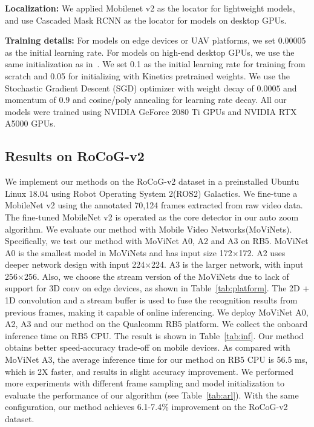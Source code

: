 \documentclass[letterpaper, 10 pt, conference]{ieeeconf}
\begin{document}
\noindent \textbf{Localization:} We applied Mobilenet v2\cite{sandler2018mobilenetv2} as the locator for lightweight models, and use Cascaded Mask RCNN\cite{hasan2021generalizable} as the locator for models on desktop GPUs.

\noindent \textbf{Training details:} For models on edge devices or UAV platforms, we set $0.00005$ as the initial learning rate. For models on high-end desktop GPUs, we use the same initialization as in~\cite{kothandaraman2022fourier}. We set 0.1 as the initial learning rate for training from scratch and 0.05 for initializing with Kinetics pretrained weights. We use the Stochastic Gradient Descent (SGD) optimizer with weight decay of $0.0005$ and momentum of $0.9$ and cosine/poly annealing for learning rate decay. All our models were trained using NVIDIA GeForce 2080 Ti GPUs and NVIDIA RTX A5000 GPUs.



\subsection{Results on RoCoG-v2}

We implement our methods on the RoCoG-v2 dataset in a preinstalled Ubuntu Linux 18.04 using Robot Operating System 2(ROS2) Galactics. We fine-tune a MobileNet v2\cite{sandler2018mobilenetv2} using the annotated 70,124 frames extracted from raw video data. The fine-tuned MobileNet v2\cite{sandler2018mobilenetv2} is operated as the core detector in our auto zoom algorithm. We evaluate our method with Mobile Video Networks(MoViNets)\cite{kondratyuk2021movinets}. Specifically, we test our method with MoViNet A0, A2 and A3 on RB5. MoViNet A0 is the smallest model in MoViNets and has input size 172$\times$172. A2 uses deeper network design with input 224$\times$224. A3 is the larger network, with input 256$\times$256. Also, we choose the stream version of the MoViNets due to lack of support for 3D conv on edge devices, as shown in Table~\ref{tab:platform}. The 2D + 1D convolution and a stream buffer is used to fuse the recognition results from previous frames, making it capable of online inferencing. We deploy MoViNet A0, A2, A3 and our method on the Qualcomm RB5 platform. We collect the onboard inference time on RB5 CPU. The result is shown in Table~\ref{tab:inf}. Our method obtains better speed-accuracy trade-off on mobile devices. As compared with MoViNet A3, the average inference time for our method on RB5 CPU is 56.5 ms, which is 2X faster, and results in slight accuracy improvement. We performed more experiments with different frame sampling and model initialization to evaluate the performance of our algorithm (see Table~\ref{tab:arl}). With the same configuration, our method achieves 6.1-7.4\% improvement on the RoCoG-v2 dataset.
\end{document}
